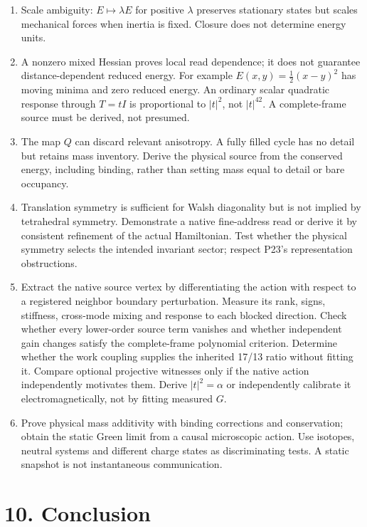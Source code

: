 \documentclass[
  11pt,
]{article}
\providecommand{\tightlist}{%
  \setlength{\itemsep}{0pt}\setlength{\parskip}{0pt}}
\begin{document}
\begin{enumerate}
\def\labelenumi{\arabic{enumi}.}
\tightlist
\item
  Scale ambiguity: \(E\mapsto\lambda E\) for positive \(\lambda\)
  preserves stationary states but scales mechanical forces when inertia
  is fixed. Closure does not determine energy units.
\item
  A nonzero mixed Hessian proves local read dependence; it does not
  guarantee distance-dependent reduced energy. For example
  \(E(x,y)=\tfrac12(x-y)^2\) has moving minima and zero reduced energy.
  An ordinary scalar quadratic response through \(T=tI\) is proportional
  to \(|t|^2\), not \(|t|^{42}\). A complete-frame source must be
  derived, not presumed.
\item
  The map \(Q\) can discard relevant anisotropy. A fully filled cycle
  has no detail but retains mass inventory. Derive the physical source
  from the conserved energy, including binding, rather than setting mass
  equal to detail or bare occupancy.
\item
  Translation symmetry is sufficient for Walsh diagonality but is not
  implied by tetrahedral symmetry. Demonstrate a native fine-address
  read or derive it by consistent refinement of the actual Hamiltonian.
  Test whether the physical symmetry selects the intended invariant
  sector; respect P23's representation obstructions.
\item
  Extract the native source vertex by differentiating the action with
  respect to a registered neighbor boundary perturbation. Measure its
  rank, signs, stiffness, cross-mode mixing and response to each blocked
  direction. Check whether every lower-order source term vanishes and
  whether independent gain changes satisfy the complete-frame polynomial
  criterion. Determine whether the work coupling supplies the inherited
  17/13 ratio without fitting it. Compare optional projective witnesses
  only if the native action independently motivates them. Derive
  \(|t|^2=\alpha\) or independently calibrate it electromagnetically,
  not by fitting measured \(G\).
\item
  Prove physical mass additivity with binding corrections and
  conservation; obtain the static Green limit from a causal microscopic
  action. Use isotopes, neutral systems and different charge states as
  discriminating tests. A static snapshot is not instantaneous
  communication.
\end{enumerate}

\section{10. Conclusion}\label{conclusion}
\end{document}
